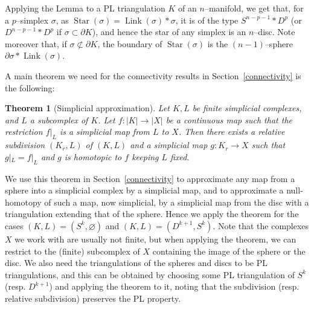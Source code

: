 \documentclass[10pt]{amsart}
\newtheorem{thm}{Theorem}[section]
\newcommand{\s}{\sigma}
\newcommand{\del}{\partial}
\newcommand{\emp}{\varnothing}
\newcommand{\link}{\operatorname{Link}}
\newcommand{\Star}{\operatorname{Star}}
\begin{document}
Applying the Lemma to a PL triangulation $K$ of an $n$--manifold, we get that, for a $p$--simplex $\s$, as  
$\Star(\s)=\link(\s)*\s$, it is of the type $S^{n-p-1}*D^p$ (or $D^{n-p-1}*D^p$ if $\s\subset\del K$), and hence the star  
of any simplex is an $n$--disc. Note moreover that, if $\s\not\subset \del K$, the boundary of $\Star(\s)$ is the $(n-1)$--sphere $\del\s*\link(\s)$. 


\medskip

A main theorem we need for the connectivity results in Section~\ref{connectivity} is the following: 

\begin{thm}[Simplicial approximation]\cite{Zee}\label{approx} 
Let $K,L$ be finite simplicial complexes, and $L$ a subcomplex of $K$. Let $f\colon |K|\to|X|$ be a continuous map such that the restriction
$f|_L$ is a simplicial map from $L$ to $X$. Then there exists a relative subdivision $(K_r,L)$ of $(K,L)$ and a simplicial 
map $g\colon K_r\to X$ such that $g|_L=f|_L$ and $g$ is homotopic to $f$ keeping $L$ fixed.    
\end{thm}

We use this theorem in Section~\ref{connectivity} to approximate any map from a sphere into a simplicial complex by a simplicial map,
and to approximate a null-homotopy of such a map, now simplicial, by a simplicial map from the disc with a triangulation extending
that of the sphere. Hence we apply the theorem for the cases $(K,L)=(S^k,\emp)$ and $(K,L)=(D^{k+1},S^k)$. Note that the complexes $X$ we
work with are usually not finite, but when applying the theorem, we can restrict to the (finite) subcomplex of $X$ containing the image
of the sphere or the disc. We also need the triangulations of the spheres and discs to be PL triangulations, and this can be obtained
by choosing some PL triangulation of $S^k$ (resp. $D^{k+1}$) and applying the theorem to it, noting that the subdivision (resp. relative
subdivision) preserves the PL property. 
\end{document}
